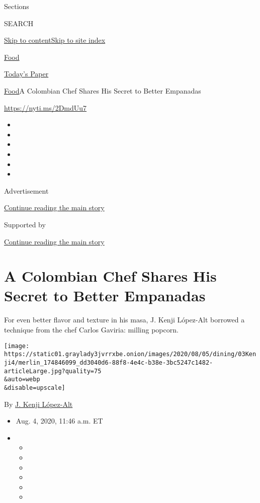 Sections

SEARCH

\protect\hyperlink{site-content}{Skip to
content}\protect\hyperlink{site-index}{Skip to site index}

\href{https://www.nytimes3xbfgragh.onion/section/food}{Food}

\href{https://myaccount.nytimes3xbfgragh.onion/auth/login?response_type=cookie\&client_id=vi}{}

\href{https://www.nytimes3xbfgragh.onion/section/todayspaper}{Today's
Paper}

\href{/section/food}{Food}\textbar{}A Colombian Chef Shares His Secret
to Better Empanadas

\url{https://nyti.ms/2DmdUu7}

\begin{itemize}
\item
\item
\item
\item
\item
\item
\end{itemize}

Advertisement

\protect\hyperlink{after-top}{Continue reading the main story}

Supported by

\protect\hyperlink{after-sponsor}{Continue reading the main story}

\hypertarget{a-colombian-chef-shares-his-secret-to-better-empanadas}{%
\section{A Colombian Chef Shares His Secret to Better
Empanadas}\label{a-colombian-chef-shares-his-secret-to-better-empanadas}}

For even better flavor and texture in his masa, J. Kenji López-Alt
borrowed a technique from the chef Carlos Gaviria: milling popcorn.

\texttt{[image: https://static01.graylady3jvrrxbe.onion/images/2020/08/05/dining/03Kenji4/merlin\_174846099\_dd3040d6-88f8-4e4c-b38e-3bc5247c1482-articleLarge.jpg?quality=75\\\&auto=webp\\\&disable=upscale]}

By \href{https://www.nytimes3xbfgragh.onion/by/j-kenji-lopez-alt}{J.
Kenji López-Alt}

\begin{itemize}
\item
  Aug. 4, 2020, 11:46 a.m. ET
\item
  \begin{itemize}
  \item
  \item
  \item
  \item
  \item
  \item
  \end{itemize}
\end{itemize}

